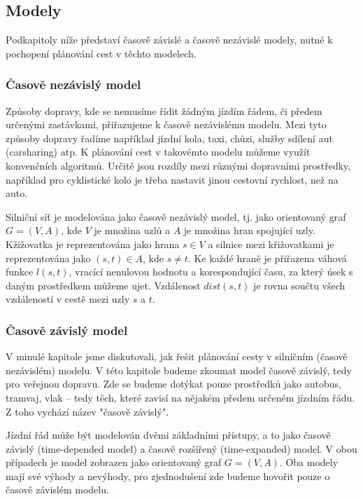 \documentclass[thesis=M,czech]{FITthesis}[2019/12/23]
\theoremstyle{plain}
\theoremstyle{definition}
\begin{document}
\subsection{Modely}

Podkapitoly níže představí časově závislé a časově nezávislé modely, nutné k pochopení plánování cest v těchto modelech.

\subsubsection{Časově nezávislý model}

Způsoby dopravy, kde se nemusíme řídit žádným jízdím řádem, či předem určenými zastávkami, přiřazujeme k časově nezávislému modelu. Mezi tyto způsoby dopravy řadíme například jízdní kola, taxi, chůzi, služby sdílení aut (carsharing) atp. K plánování cest v takovémto modelu můžeme využít konvenčních algoritmů. Určitě jsou rozdíly mezi různými dopravními prostředky, například  pro cyklistické kolo je třeba nastavit jinou cestovní rychlost, než na auto. 


Silniční síť je modelována jako časově nezávislý model, tj. jako orientovaný graf $G = (V, A)$, kde $V$ je množina uzlů a $A$ je množina hran spojující uzly. Kžižovatka je reprezentována jako hrana $ s \in V $ a silnice mezi křižovatkami je reprezentována jako  $ (s, t) \in A $, kde $s \neq t $. Ke každé hraně je přiřazena váhová funkce $l(s, t)$, vracící nenulovou hodnotu a korespondující času, za který úsek s daným prostředkem můžeme ujet. Vzdálenost $dist(s,t)$ je rovna součtu všech vzdáleností v cestě mezi uzly $s$ a $t$. \cite{multimodal-route-planning}



\subsubsection{Časově závislý model}

V minulé kapitole jsme diskutovali, jak řešit plánování cesty v silničním (časově nezávislém) modelu. V této kapitole budeme zkoumat model časově závislý, tedy pro veřejnou dopravu. Zde se budeme dotýkat pouze prostředků jako autobus, tramvaj, vlak -- tedy těch, které zavisí na nějakém předem určeném jízdním řádu. Z toho vychází název "časově závislý".



Jízdní řád může být modelován dvěmi základními přístupy, a to jako časově závislý (time-depended model) a časově rozšířený (time-expanded) model. V obou případech je model zobrazen jako orientovaný graf $G = (V, A)$. Oba modely mají své výhody a nevýhody, pro zjednodušení zde budeme hovořit pouze o časově závislém modelu. 
\end{document}
